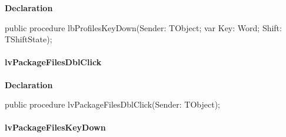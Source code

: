 \documentclass{report}
\newif\ifpdf
\begin{document}
\label{prjwizard.TfrmProjectWizard-lbProfilesKeyDown}
\begin{list}{}{
\setlength{\itemindent}{0cm}
\setlength{\listparindent}{0cm}
\setlength{\leftmargin}{\evensidemargin}
\addtolength{\leftmargin}{\tmplength}
\settowidth{\labelsep}{X}
\addtolength{\leftmargin}{\labelsep}
\setlength{\labelwidth}{\tmplength}
}
\item[\textbf{Declaration}\hfill]
\ifpdf
\begin{flushleft}
\fi
\begin{ttfamily}
public procedure lbProfilesKeyDown(Sender: TObject; var Key: Word; Shift: TShiftState);\end{ttfamily}

\ifpdf
\end{flushleft}
\fi

\end{list}
\paragraph*{lvPackageFilesDblClick}\hspace*{\fill}

\label{prjwizard.TfrmProjectWizard-lvPackageFilesDblClick}
\begin{list}{}{
\setlength{\itemindent}{0cm}
\setlength{\listparindent}{0cm}
\setlength{\leftmargin}{\evensidemargin}
\addtolength{\leftmargin}{\tmplength}
\settowidth{\labelsep}{X}
\addtolength{\leftmargin}{\labelsep}
\setlength{\labelwidth}{\tmplength}
}
\item[\textbf{Declaration}\hfill]
\ifpdf
\begin{flushleft}
\fi
\begin{ttfamily}
public procedure lvPackageFilesDblClick(Sender: TObject);\end{ttfamily}

\ifpdf
\end{flushleft}
\fi

\end{list}
\paragraph*{lvPackageFilesKeyDown}\hspace*{\fill}
\end{document}
